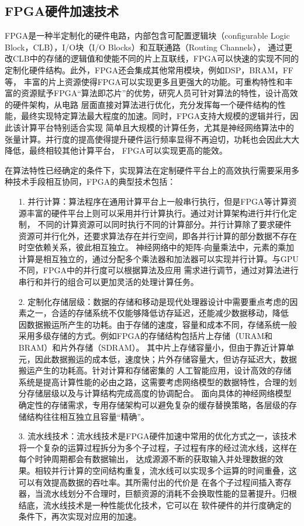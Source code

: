 \subsection{FPGA硬件加速技术}

FPGA是一种半定制化的硬件电路，内部包含可配置逻辑块（configurable Logic Block，CLB），I/O块（I/O Blocks）和互联通路（Routing Channels），
通过更改CLB中的存储的逻辑值和使能不同的片上互联线，FPGA可以快速的实现不同的定制化硬件结构。此外，FPGA还会集成其他常用模块，例如DSP，BRAM，FF等，
丰富的片上资源使得FPGA可以实现更多且更强大的功能。可重构特性和丰富的资源赋予FPGA“算法即芯片”的优势，研究人员可针对算法的特性，设计高效的硬件架构，从电路
层面直接对算法进行优化，充分发挥每一个硬件结构的性能，最终实现特定算法最大程度的加速。同时，FPGA支持大规模的逻辑并行，因此该计算平台特别适合实现
简单且大规模的计算任务，尤其是神经网络算法中的张量计算。并行度的提高使得提升硬件运行频率显得不再迫切，功耗也会因此大大降低，最终相较其他计算平台，
FPGA可以实现更高的能效。

在算法特性已经确定的条件下，实现算法在定制硬件平台上的高效执行需要采用多种技术手段相互协同，FPGA的典型技术包括：

\begin{itemize}
\vspace{4pt}
\item[1.]并行计算：算法程序在通用计算平台上一般串行执行，但是FPGA等计算资源丰富的硬件平台上则可以采用并行计算执行。通过对计算架构进行并行化定制，
不同的计算资源可以同时执行不同的计算部分。并行计算除了要求硬件资源可并行化外，还要求算法存在并行空间，即各并行计算的部分数据不存在时空依赖关系，彼此相互独立。
神经网络中的矩阵-向量乘法中，元素的乘加计算是相互独立的，通过分配多个乘法器和加法器可以实现并行计算。与GPU不同，FPGA中的并行度可以根据算法及应用
需求进行调节，通过对算法进行串行和并行的组合可以更加灵活的处理计算任务。
\vspace{4pt}
\item[2.]定制化存储层级：数据的存储和移动是现代处理器设计中需要重点考虑的因素之一，合适的存储系统不仅能够降低访存延迟，还能减少数据移动，降低
因数据搬运所产生的功耗。由于存储的速度，容量和成本不同，存储系统一般采用多级存储的方式。例如FPGA的存储结构包括片上存储（URAM和BRAM）和片外存储（SDRAM）。
其中片上存储容量小，但由于靠近计算单元，因此数据搬运的成本低，速度快；片外存储容量大，但访存延迟大，数据搬运产生的功耗高。针对计算和存储密集的
人工智能应用，设计高效的存储系统是提高计算性能的必由之路，这需要考虑网络模型的数据特性，合理的划分存储层级以及与计算结构完成高度的协调配合。
面向具体的神经网络模型确定性的存储需求，专用存储架构可以避免复杂的缓存替换策略，各层级的存储结构往往相互独立且容量“精确”。
\vspace{4pt}
\item[3.]流水线技术：流水线技术是FPGA硬件加速中常用的优化方式之一，该技术将一个复杂的运算过程拆分为多个子过程，子过程有序的经过流水线，这样在每个时钟周期都会有数据输出，
达成源源不断的获取输入并处理数据的效果。相较并行计算的空间结构重复，流水线可以实现多个运算的时间重叠，这可以有效提高数据的吞吐率。其所需付出的代价是
在各个子过程间插入寄存器，当流水线划分不合理时，巨额资源的消耗不会换取性能的显著提升。归根结底，流水线技术是一种性能优化技术，它可以在
软件硬件的并行度确定的条件下，再次实现对应用的加速。

\end{itemize}
